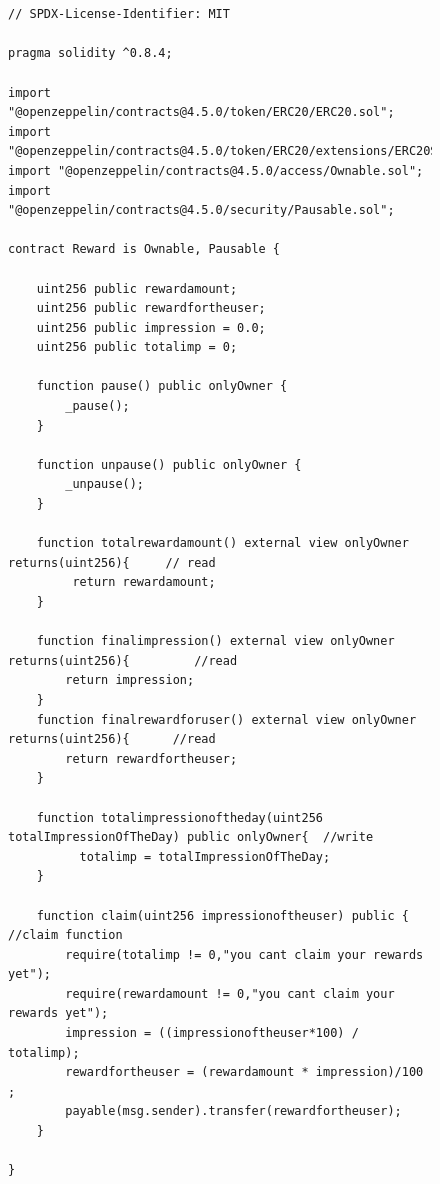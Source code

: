 \documentclass[letterpaper,11pt]{article}
\begin{document}
\begin{figure}

\begin{lstlisting}[language=Solidity, caption={Example User Reward APPA Contract in Solidity}, numbers=none]


// SPDX-License-Identifier: MIT

pragma solidity ^0.8.4;

import "@openzeppelin/contracts@4.5.0/token/ERC20/ERC20.sol";
import "@openzeppelin/contracts@4.5.0/token/ERC20/extensions/ERC20Snapshot.sol";
import "@openzeppelin/contracts@4.5.0/access/Ownable.sol";
import "@openzeppelin/contracts@4.5.0/security/Pausable.sol";

contract Reward is Ownable, Pausable {
   
    uint256 public rewardamount;
    uint256 public rewardfortheuser;
    uint256 public impression = 0.0;
    uint256 public totalimp = 0;
    
    function pause() public onlyOwner {
        _pause();
    }
    
    function unpause() public onlyOwner {
        _unpause();
    }
    
    function totalrewardamount() external view onlyOwner returns(uint256){     // read 
         return rewardamount;
    }

    function finalimpression() external view onlyOwner returns(uint256){         //read
        return impression;
    }
    function finalrewardforuser() external view onlyOwner returns(uint256){      //read
        return rewardfortheuser;
    }

    function totalimpressionoftheday(uint256 totalImpressionOfTheDay) public onlyOwner{  //write
          totalimp = totalImpressionOfTheDay;
    }
    
    function claim(uint256 impressionoftheuser) public {                         //claim function
        require(totalimp != 0,"you cant claim your rewards yet");
        require(rewardamount != 0,"you cant claim your rewards yet");
        impression = ((impressionoftheuser*100) / totalimp);
        rewardfortheuser = (rewardamount * impression)/100 ;
        payable(msg.sender).transfer(rewardfortheuser);
    }

}
\end{lstlisting}
\end{figure}
\end{document}
